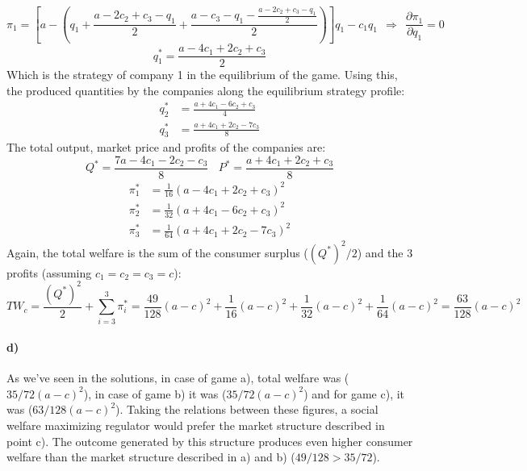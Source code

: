 \documentclass[10pt,a4paper]{article}
\begin{document}
\begin{equation}
	\pi_1 = \left[ a- \left( q_1+ \frac{a-2 c_2+c_3-q_1}{2}+\frac{a-c_3-q_1-\frac{a-2 c_2+c_3-q_1}{2}}{2} \right) \right]q_1-c_1q_1 ~~ \Rightarrow ~~ \frac{\partial \pi_1}{\partial q_1} = 0
\end{equation}
\begin{equation}
	q_1^* = \frac{a-4c_1+2 c_2+c_3}{2}
\end{equation}
Which is the strategy of company 1 in the equilibrium of the game. Using this, the produced quantities by the companies along the equilibrium strategy profile:
\begin{align*}
	q_2^* &= \frac{a+4 c_1-6 c_2+c_3}{4} \\
	q_3^* &= \frac{a+4 c_1+2 c_2-7 c_3}{8}
\end{align*}
The total output, market price and profits of the companies are:
\begin{equation}
	Q^*= \frac{7 a-4 c_1-2 c_2-c_3}{8} ~~~~ P^* = \frac{a+4 c_1+2 c_2+c_3}{8}
\end{equation}
\begin{align*}
	\pi_1^* &= \frac{1}{16} (a-4 c_1+2 c_2+c_3)^2 \\
	\pi_2^* &= \frac{1}{32} (a+4 c_1-6 c_2+c_3)^2 \\
	\pi_3^* &= \frac{1}{64} (a+4 c_1+2 c_2-7 c_3)^2
\end{align*}
Again, the total welfare is the sum of the consumer surplus ($(Q^*)^2/2$) and the 3 profits (assuming $c_1=c_2=c_3=c$):
\begin{equation}
	TW_c = \frac{(Q^*)^2}{2} + \sum\limits_{i=3}^3 \pi^*_i =\frac{49}{128} (a-c)^2+\frac{1}{16} (a-c)^2+\frac{1}{32} (a-c)^2+\frac{1}{64} (a-c)^2 = \frac{63}{128} (a-c)^2
\end{equation}
\paragraph*{d)}
As we've seen in the solutions, in case of game a), total welfare was ($35/72 (a-c)^2$), in case of game b) it was ($35/72 (a-c)^2$) and for game c), it was ($63/128 (a-c)^2$). Taking the relations between these figures, a social welfare maximizing regulator would prefer the market structure described in point c). The outcome generated by this structure produces even higher consumer welfare than the market structure described in a) and b) ($49/128 > 35/72$). 
\end{document}
